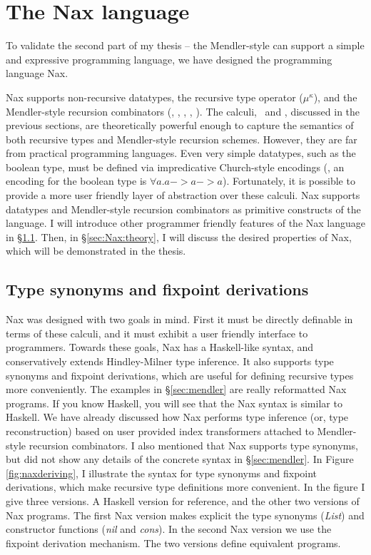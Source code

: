 \section{The Nax language}\label{sec:Nax}

To validate the second part of my thesis -- the Mendler-style can support 
a simple and expressive programming language, we have designed the
programming language Nax.

Nax supports non-recursive datatypes, the recursive type operator
($\mu^\kappa$), and the Mendler-style recursion combinators (\MIt, \MPr,
\McvIt, \McvPr, \MsfIt). The calculi, \Fi\ and \Fixi, discussed
in the previous sections, are theoretically powerful enough to capture
the semantics of both recursive types and Mendler-style recursion schemes.
However, they are far from practical programming languages. Even very simple
datatypes, such as the boolean type, must be defined via impredicative 
Church-style encodings (\eg, an encoding for the boolean type is
$\forall a . a -> a -> a$). Fortunately, it is possible to provide
a more user friendly layer of abstraction over these calculi. Nax supports
datatypes and Mendler-style recursion combinators as primitive constructs of
the language. I will introduce other programmer friendly features of
the Nax language in \S\ref{sec:Nax:tysym}. Then, in \S\ref{sec:Nax:theory},
I will discuss the desired properties of Nax, which will be demonstrated
in the thesis.

\subsection{Type synonyms and fixpoint derivations}\label{sec:Nax:tysym}

Nax was designed with two goals in mind. First it must be directly definable
in terms of these calculi, and it must exhibit a user friendly interface to
programmers. Towards these goals, Nax has a Haskell-like syntax, and
conservatively extends Hindley-Milner type inference. It also supports
type synonyms and fixpoint derivations, which are useful for defining
recursive types more conveniently. The examples in \S\ref{sec:mendler} are
really reformatted Nax programs. If you know Haskell, you will see that
the Nax syntax is similar to Haskell. We have already discussed how Nax
performs type inference (or, type reconstruction) based on user provided
index transformers attached to Mendler-style recursion combinators. I also
mentioned that Nax supports type synonyms, but did not show any details of
the concrete syntax in \S\ref{sec:mendler}. In Figure \ref{fig:naxderiving},
I illustrate the syntax for type synonyms and fixpoint derivations, which make
recursive type definitions more convenient. In the figure I give three versions.
A Haskell version for reference, and the other two versions of Nax programs.
The first Nax version makes explicit the type synonyms (\textit{List})
and constructor functions (\textit{nil} and \textit{cons}).
In the second Nax version we use the fixpoint derivation mechanism.
The two versions define equivalent programs.

